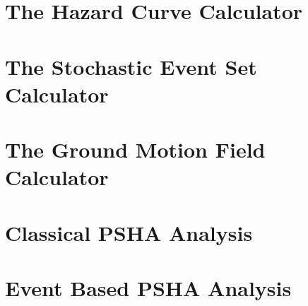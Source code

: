 \documentclass[12pt,a4paper,headings=small,version=first,dvips]{scrbook}
\begin{document}
\chapter{The Hazard Curve Calculator}
	\label{chap:hcc}
		
\chapter{The Stochastic Event Set Calculator}
	\label{chap:sesc}
		
\chapter{The Ground Motion Field Calculator}
	\label{chap:gmfc}
		
\chapter{Classical PSHA Analysis}
	\label{chap:cpsha}
		
\chapter{Event Based PSHA Analysis}
	\label{chap:ebpsha}
		
\end{document}
